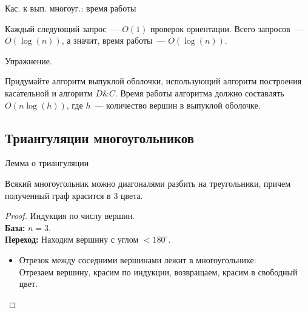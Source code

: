     \begin{frame}{Кас. к вып. многоуг.: время работы}

        Каждый следующий запрос~--- $O(1)$ проверок ориентации.
        Всего запросов~--- $O(\log(n))$, а значит, время работы~--- $O(\log(n))$.
        
        \vspace{5mm}
        
        \begin{block}{Упражнение.}

            Придумайте алгоритм выпуклой оболочки, использующий алгоритм построения касательной и алгоритм
            $D\&C$. Время работы алгоритма должно составлять $O(n\log(h))$, где $h$~--- количество вершин  в выпуклой оболочке.

        \end{block}

    \end{frame}

    \subsection{Триангуляции многоугольников}

    \begin{frame}{Лемма о триангуляции}

    \vspace{2mm}
    \begin{lm}[О триангуляции]\hypertarget{trianglemm}{}

        Всякий многоугольник можно диагоналями разбить на треугольники, причем полученный граф красится в 3 цвета.

    \end{lm}

    \begin{proof}\let\qed\relax
        Индукция по числу вершин.\\

        \textbf{База:} $n = 3$.\\
        \textbf{Переход:} Находим вершину с  углом $<180^{\circ}$.\\

        \begin{itemize}

            \item Отрезок между соседними  вершинами лежит в многоугольнике:\\
            Отрезаем вершину, красим по индукции, возвращаем, красим в свободный цвет.

        \end{itemize}

    \end{proof}

    \end{frame}

